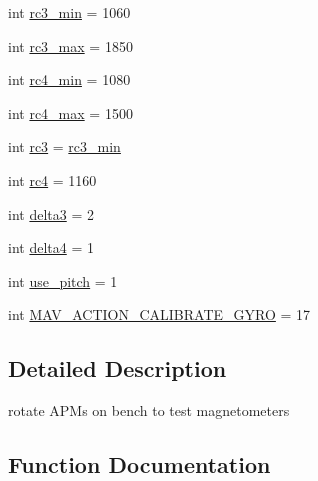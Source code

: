 \begin{DoxyCompactItemize}
\item 
int \mbox{\hyperlink{namespacepymavlink_1_1examples_1_1magtest_af92d1c950ac101b69806b7714ce9ae92}{rc3\+\_\+min}} = 1060
\item 
int \mbox{\hyperlink{namespacepymavlink_1_1examples_1_1magtest_ae1a1fcf76a0fd9a85b0047f91a164ba7}{rc3\+\_\+max}} = 1850
\item 
int \mbox{\hyperlink{namespacepymavlink_1_1examples_1_1magtest_a2a2275c4bbdc823c8f895bb63e4039c7}{rc4\+\_\+min}} = 1080
\item 
int \mbox{\hyperlink{namespacepymavlink_1_1examples_1_1magtest_a84113c17f1b736a0346be69f763dcd6e}{rc4\+\_\+max}} = 1500
\item 
int \mbox{\hyperlink{namespacepymavlink_1_1examples_1_1magtest_a5f4f85280403824f4515003203b490b6}{rc3}} = \mbox{\hyperlink{namespacepymavlink_1_1examples_1_1magtest_af92d1c950ac101b69806b7714ce9ae92}{rc3\+\_\+min}}
\item 
int \mbox{\hyperlink{namespacepymavlink_1_1examples_1_1magtest_aa9bde9712f6ffdff13b645156c09dfab}{rc4}} = 1160
\item 
int \mbox{\hyperlink{namespacepymavlink_1_1examples_1_1magtest_a37cbe5d4fa2ee121f942f429b5410480}{delta3}} = 2
\item 
int \mbox{\hyperlink{namespacepymavlink_1_1examples_1_1magtest_aa4df78ddff63972a042d7aa5c592c55e}{delta4}} = 1
\item 
int \mbox{\hyperlink{namespacepymavlink_1_1examples_1_1magtest_abb93a4c501f31a01d184d4e3f3d69ca1}{use\+\_\+pitch}} = 1
\item 
int \mbox{\hyperlink{namespacepymavlink_1_1examples_1_1magtest_a8b7b677aa683b3117014b1b8c4c6587a}{M\+A\+V\+\_\+\+A\+C\+T\+I\+O\+N\+\_\+\+C\+A\+L\+I\+B\+R\+A\+T\+E\+\_\+\+G\+Y\+RO}} = 17
\end{DoxyCompactItemize}


\subsection{Detailed Description}
\begin{DoxyVerb}rotate APMs on bench to test magnetometers\end{DoxyVerb}
 

\subsection{Function Documentation}
\mbox{\label{namespacepymavlink_1_1examples_1_1magtest_a85f95abe31f900d634b0c548cb8263cb}} 
